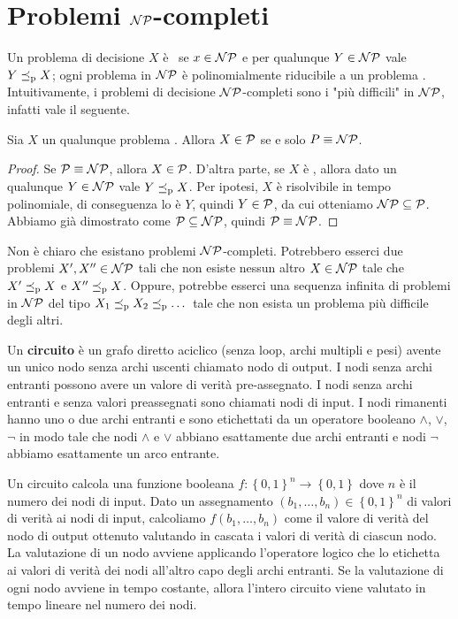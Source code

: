 \section{Problemi $\NP$-completi}

Un problema di decisione $X$ è \NPc\ se $x \in \NP$ e per qualunque $Y \in \NP$ vale $Y \polred X$; ogni problema in $\NP$ è polinomialmente riducibile a un problema \NPc. Intuitivamente, i problemi di decisione $\NP$-completi sono i "più difficili" in $\NP$, infatti vale il seguente.\\

\begin{fact}
    Sia $X$ un qualunque problema \NPc. Allora $X \in \P$ se e solo $P \equiv \NP$.
\end{fact}
\begin{proof}
    Se $\P \equiv \NP$, allora $X \in \P$. D'altra parte, se $X$ è \NPc, allora dato un qualunque $Y \in \NP$ vale $Y \polred X$. Per ipotesi, $X$ è risolvibile in tempo polinomiale, di conseguenza lo è $Y$, quindi $Y \in \P$, da cui otteniamo $\NP \subseteq \P$. Abbiamo già dimostrato come $\P \subseteq \NP$, quindi $\P \equiv \NP$.
\end{proof}

Non è chiaro che esistano problemi $\NP$-completi. Potrebbero esserci due problemi $X', X'' \in \NP$ tali che non esiste nessun altro $X \in \NP$ tale che $X' \polred X$ e $X'' \polred X$. Oppure, potrebbe esserci una sequenza infinita di problemi in $\NP$ del tipo $X_1 \polred X_2 \polred \dots$ tale che non esista un problema più difficile degli altri.

Un \textbf{circuito} è un grafo diretto aciclico (senza loop, archi multipli e pesi) avente un unico nodo senza archi uscenti chiamato nodo di output.  I nodi senza archi entranti possono avere un valore di verità pre-assegnato. I nodi senza archi entranti e senza valori preassegnati sono chiamati nodi di input. I nodi rimanenti hanno uno o due archi entranti e sono etichettati da un operatore booleano $\wedge$, $\vee$, $\neg$ in modo tale che nodi $\wedge$ e $\vee$ abbiano esattamente due archi entranti e nodi $\neg$ abbiamo esattamente un arco entrante.

Un circuito calcola una funzione booleana $f: \left\{0,1\right\}^n \rightarrow \left\{0,1\right\}$ dove $n$ è il numero dei nodi di input. Dato un assegnamento $\left(b_1, \dots, b_n\right) \in \left\{0,1\right\}^n$ di valori di verità ai nodi di input, calcoliamo $f\left(b_1, \dots, b_n\right)$ come il valore di verità del nodo di output ottenuto valutando in cascata i valori di verità di ciascun nodo. La valutazione di un nodo avviene applicando l'operatore logico che lo etichetta ai valori di verità dei nodi all'altro capo degli archi entranti. Se la valutazione di ogni nodo avviene in tempo costante, allora l'intero circuito viene valutato in tempo lineare nel numero dei nodi.

